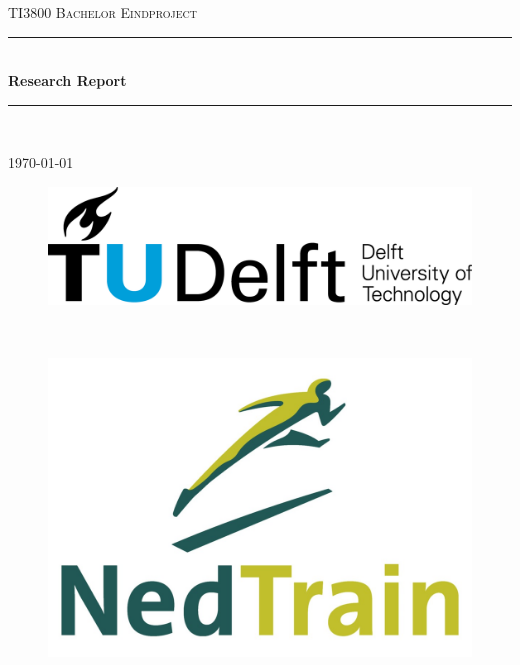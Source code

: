 \documentclass[a4paper]{article}
\makeatletter
\newcommand{\specialcell}[2][c]{\begin{tabular}[#1]{@{}c@{}}#2\end{tabular}}
\newcommand{\HRule}{\rule{\linewidth}{0.5mm}}
\makeatother
\begin{document}
\begin{titlepage}
\center
\textsc{\huge TI3800 Bachelor Eindproject}\\[1.5cm]
\HRule \\[0.4cm]
{\Huge \bfseries Research Report}\\[0.4cm]
\HRule \\[1.5cm]

{\large \today}\\[2cm]

\begin{figure}[b]
\centering
\begin{minipage}{0.4\textwidth}
\begin{flushleft}
\includegraphics[width=0.9\linewidth]{images/TU_Delft_logo.png}
\end{flushleft}
\end{minipage}
~
\begin{minipage}{0.4\textwidth}
\begin{flushright}
\includegraphics[width=0.9\linewidth]{images/NedTrain_logo.png}
\end{flushright}
\end{minipage}\\[2cm]
\end{figure}

\vfill

\end{titlepage}


% 

\newpage

\tableofcontents

\newpage

% 

\newpage



\end{document}
